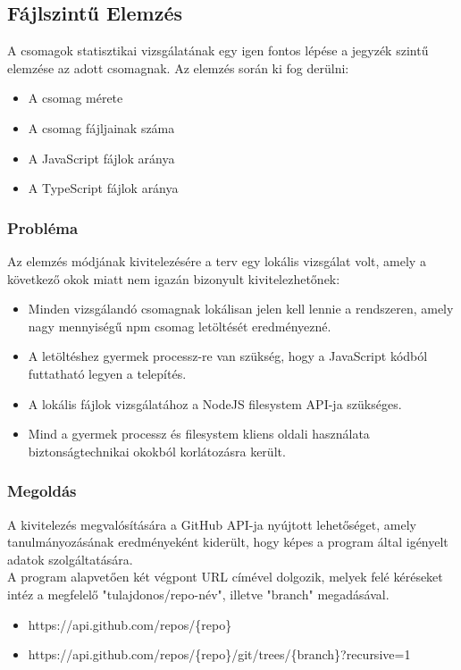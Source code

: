 \subsection{Fájlszintű Elemzés} 
A csomagok statisztikai vizsgálatának egy igen fontos lépése a jegyzék szintű elemzése az adott csomagnak. Az elemzés során ki fog derülni:
\begin{itemize}
	\item A csomag mérete
	\item A csomag fájljainak száma
	\item A JavaScript fájlok aránya
	\item A TypeScript fájlok aránya
\end{itemize}

\subsubsection{Probléma}
Az elemzés módjának kivitelezésére a terv egy lokális vizsgálat volt, amely a következő okok miatt nem igazán bizonyult kivitelezhetőnek:
\begin{itemize}
	\item Minden vizsgálandó csomagnak lokálisan jelen kell lennie a rendszeren, amely nagy mennyiségű npm csomag letöltését eredményezné.
	\item A letöltéshez gyermek processz-re van szükség, hogy a JavaScript kódból futtatható legyen a telepítés.
	\item A lokális fájlok vizsgálatához a NodeJS filesystem API-ja szükséges.
	\item Mind a gyermek processz és filesystem kliens oldali használata biztonságtechnikai okokból korlátozásra került.
\end{itemize}

\subsubsection{Megoldás}
A kivitelezés megvalósítására a GitHub API-ja nyújtott lehetőséget, amely tanulmányozásának eredményeként kiderült, hogy képes a program által igényelt adatok szolgáltatására.\\

A program alapvetően két végpont URL címével dolgozik, melyek felé kéréseket intéz a megfelelő "tulajdonos/repo-név", illetve "branch" megadásával.
\begin{itemize}
	\item https://api.github.com/repos/\{repo\}
	\item https://api.github.com/repos/\{repo\}/git/trees/\{branch\}?recursive=1
\end{itemize}

